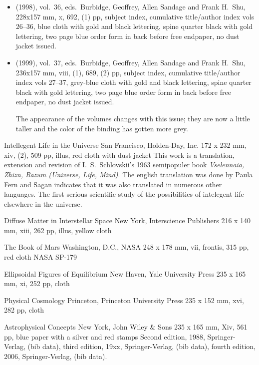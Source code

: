 \begin{itemize}
	\item (1998), vol.\ 36, eds.\ Burbidge, Geoffrey, Allen Sandage and Frank H.\ Shu, 228x157 mm,
	x, 692, (1) pp, subject index, cumulative title/author index vols 26--36,
	blue cloth with gold and black lettering, spine quarter black with gold lettering,
	two page blue order form in back before free endpaper, no dust jacket	issued.
	
	\item (1999), vol.\ 37, eds.\ Burbidge, Geoffrey, Allen Sandage and Frank H.\ Shu, 236x157 mm,
	viii, (1), 689, (2) pp, subject index, cumulative title/author index vols 27--37,
	grey-blue cloth with gold and black lettering, spine quarter black with gold lettering,
	two page blue order form in back before free endpaper, no dust jacket	issued.
	
	The appearance of the volumes changes with this issue; they are now a little taller
	and the color of the binding has gotten more grey.
	
\end{itemize}


{Intellegent Life in the Universe}
{San Francisco, Holden-Day, Inc.}
{172 x 232 mm, xiv, (2), 509 pp, illus, red cloth with dust jacket}
{}
This work is a translation, extension and revision of I.\ S.\ Schlovskii's
1963 semipopuler book {\it Vselennaia, Zhizn, Razum (Universe, Life, Mind)}.
The english translation was done by Paula Fern and Sagan indicates that it
was also translated in numerous other languages.  The first serious scientific study 
of the possibilities of intelegent life elsewhere in the universe.

{Diffuse Matter in Interstellar Space}
{New York, Interscience Publishers}
{216 x 140 mm, xiii, 262 pp, illus, yellow cloth}
{}

{The Book of Mars}
{Washington, D.C., NASA}
{248 x 178 mm, vii, frontis, 315 pp, red cloth}
{}
NASA SP-179

{Ellipsoidal Figures of Equilibrium}
{New Haven, Yale University Press}
{235 x 165 mm, xi, 252 pp, cloth}
{}

{Physical Cosmology}
{Princeton, Princeton University Press}
{235 x 152 mm, xvi, 282 pp, cloth}
{}

{Astrophysical Concepts}
{New York, John Wiley \& Sons}
{235 x 165 mm, Xiv, 561 pp, blue paper with a silver and red stamps}
{}
Second edition, 1988, Springer-Verlag, (bib data),
third edition, 19xx, Springer-Verlag, (bib data),
fourth edition, 2006, Springer-Verlag, (bib data).


